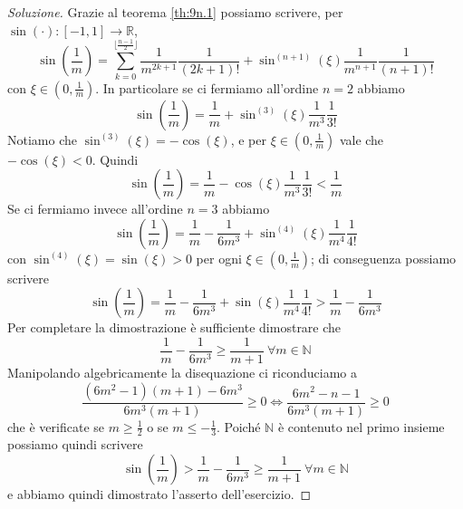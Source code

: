 \begin{proof}[Soluzione]
    Grazie al teorema \ref{th:9n.1} possiamo scrivere, per $\sin(\cdot)\colon[-1,1]\to\mathbb{R}$,
    \[
    \sin\left(\frac{1}{m}\right)= \sum_{k=0}^{\lfloor \frac{n-1}{2}\rfloor} \frac{1}{m^{2k+1}}\frac{1}{(2k+1)!}+\sin^{(n+1)}(\xi)\frac{1}{m^{n+1}}\frac{1}{(n+1)!}
    \]
    con $\xi\in\left(0, \frac{1}{m}\right)$. In particolare se ci fermiamo all'ordine $n=2$ abbiamo
    \[
    \sin\left(\frac{1}{m}\right) = \frac{1}{m}+\sin^{(3)}(\xi)\frac{1}{m^{3}}\frac{1}{3!}
    \]
    Notiamo che $\sin^{(3)}(\xi)= -\cos(\xi)$, e per $\xi\in\left(0, \frac{1}{m}\right)$ vale che $-\cos(\xi)<0$. Quindi
    \[
    \sin\left(\frac{1}{m}\right) = \frac{1}{m}-\cos(\xi)\frac{1}{m^{3}}\frac{1}{3!}<\frac{1}{m}
    \]
    Se ci fermiamo invece all'ordine $n=3$ abbiamo
    \[
    \sin\left(\frac{1}{m}\right) = \frac{1}{m}-\frac{1}{6m^3}+\sin^{(4)}(\xi)\frac{1}{m^{4}}\frac{1}{4!}
    \]
    con $\sin^{(4)}(\xi) = \sin(\xi)>0$ per ogni $\xi\in\left(0, \frac{1}{m}\right)$; di conseguenza possiamo scrivere
    \[
    \sin\left(\frac{1}{m}\right) = \frac{1}{m}-\frac{1}{6m^3}+\sin(\xi)\frac{1}{m^{4}}\frac{1}{4!}>\frac{1}{m}-\frac{1}{6m^3}
    \]
    Per completare la dimostrazione è sufficiente dimostrare che
    \[
    \frac{1}{m}-\frac{1}{6m^3}\ge\frac{1}{m+1}  \ \forall m\in\mathbb{N}
    \]
    Manipolando algebricamente la disequazione ci riconduciamo a
    \[
    \frac{(6m^2-1)(m+1)-6m^3}{6m^3(m+1)}\ge 0 \iff \frac{6m^2-n-1}{6m^3(m+1)}\ge 0 
    \]
    che è verificate se $m\ge \frac{1}{2}$ o se $m\le -\frac{1}{3}$. Poiché $\mathbb{N}$ è contenuto nel primo insieme possiamo quindi scrivere
    \[
    \sin\left(\frac{1}{m}\right) >\frac{1}{m}-\frac{1}{6m^3}\ge\frac{1}{m+1} \ \forall m\in\mathbb{N}
    \]
    e abbiamo quindi dimostrato l'asserto dell'esercizio.
\end{proof}
